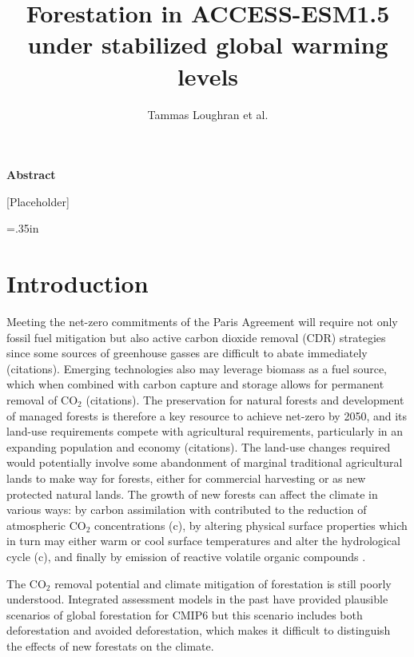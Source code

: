 \documentclass[]{article}
\title{Forestation in ACCESS-ESM1.5 under stabilized global warming levels}
\author{Tammas Loughran et al.}
\begin{document}
\maketitle

\begin{center}
    \Large
    \vspace{0.9cm}
    \textbf{Abstract}
\end{center}

[Placeholder]

\raggedright
\parindent=.35in %

\section{Introduction}

Meeting the net-zero commitments of the Paris Agreement will require not only fossil fuel mitigation but also active carbon dioxide removal (CDR) strategies since some sources of greenhouse gasses are difficult to abate immediately (citations).
Emerging technologies also may leverage biomass as a fuel source, which when combined with carbon capture and storage allows for permanent removal of CO$_2$ (citations).
The preservation for natural forests and development of managed forests is therefore a key resource to achieve net-zero by 2050, and its land-use requirements compete with agricultural requirements, particularly in an expanding population and economy (citations).
The land-use changes required would potentially involve some abandonment of marginal traditional agricultural lands to make way for forests, either for commercial harvesting or as new protected natural lands.
The growth of new forests can affect the climate in various ways: by carbon assimilation with contributed to the reduction of atmospheric CO$_2$ concentrations (c), by altering physical surface properties which in turn may either warm or cool surface temperatures and alter the hydrological cycle (c), and finally by emission of reactive volatile organic compounds \parencite{weber_chemistry_albedo_2024}.



The CO$_2$ removal potential and climate mitigation of forestation is still poorly understood.
Integrated assessment models in the past have provided plausible scenarios of global forestation for
CMIP6 but this scenario includes both deforestation and avoided deforestation, which makes it
difficult to distinguish the effects of new forestats on the climate.
\end{document}
